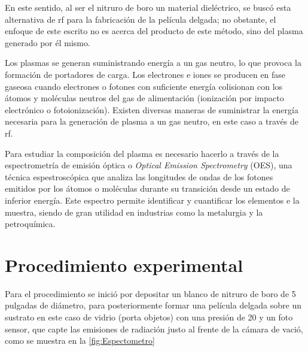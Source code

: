 \documentclass[12pt]{IEEEtran}
\begin{document}
En este sentido, al ser el nitruro de boro un material dieléctrico, se buscó esta alternativa de rf para la fabricación de la película delgada; no obstante, el enfoque de este escrito no es acerca del producto de este método, sino del plasma generado por él mismo.

Los plasmas se generan suministrando energía a un gas neutro, lo que provoca la formación de portadores de carga. Los electrones e iones se producen en fase gaseosa cuando electrones o fotones con suficiente energía colisionan con los átomos y moléculas neutros del gas de alimentación (ionización por impacto electrónico o fotoionización). Existen diversas maneras de suministrar la energía necesaria para la generación de plasma a un gas neutro, en este caso a través de rf.\cite{mattoxChapter7Physical2010}

Para estudiar la composición del plasma es necesario hacerlo a través de la espectrometría de emisión óptica o \emph{Optical Emission Spectrometry} (OES), una técnica espestroscópica que analiza las longitudes de ondas de los fotones emitidos por los átomos o moléculas durante su transición desde un estado de inferior energía. Este espectro permite identificar y cuantificar los elementos e la muestra, siendo de gran utilidad en industrias como la metalurgia y la petroquímica.\cite{QueEsAnalisis,AnalisisPorEmision2025}

\section{Procedimiento experimental}

Para el procedimiento se inició por depositar un blanco de nitruro de boro de 5 pulgadas de diámetro, para posteriormente formar una película delgada sobre un sustrato en este caso de vidrio (porta objetos) con una presión de \qty{20}{\mTorr} y un foto sensor, que capte las emisiones de radiación justo al frente de la cámara de vació, como se muestra en la \cref{fig:Espectometro}
\end{document}
